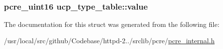 \subsubsection[{\texorpdfstring{value}{value}}]{\setlength{\rightskip}{0pt plus 5cm}pcre\+\_\+uint16 ucp\+\_\+type\+\_\+table\+::value}\hypertarget{structucp__type__table_a4adbaf2a4ff811876e537e596ec80dd1}{}\label{structucp__type__table_a4adbaf2a4ff811876e537e596ec80dd1}


The documentation for this struct was generated from the following file\+:\begin{DoxyCompactItemize}
\item 
/usr/local/src/github/\+Codebase/httpd-\/2../srclib/pcre/\hyperlink{pcre__internal_8h}{pcre\+\_\+internal.\+h}\end{DoxyCompactItemize}
